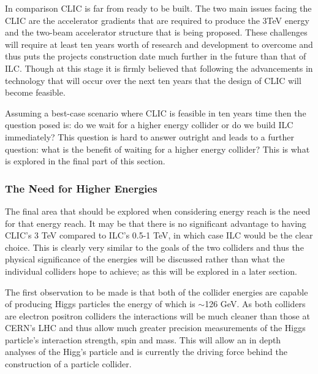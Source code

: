 In comparison CLIC is far from ready to be built. The two main issues facing the CLIC are the accelerator gradients that are required to produce the 3TeV energy and the two-beam accelerator structure that is being proposed. These challenges will require at least ten years worth of research and development to overcome and thus puts the projects construction date much further in the future than that of ILC. Though at this stage it is firmly believed that following the advancements in technology that will occur over the next ten years that the design of CLIC will become feasible.

Assuming a best-case scenario where CLIC is feasible in ten years time then the question posed is: do we wait for a higher energy collider or do we build ILC immediately? This question is hard to answer outright and leads to a further question: what is the benefit of waiting for a higher energy collider? This is what is explored in the final part of this section.

\subsubsection{The Need for Higher Energies}
The final area that should be explored when considering energy reach is the need for that energy reach. It may be that there is no significant advantage to having CLIC's 3 TeV compared to ILC's 0.5-1 TeV, in which case ILC would be the clear choice. This is clearly very similar to the goals of the two colliders and thus the physical significance of the energies will be discussed rather than what the individual colliders hope to achieve; as this will be explored in a later section.

The first observation to be made is that both of the collider energies are capable of producing Higgs particles the energy of which is $\sim$126 GeV\cite{CERN:Higgs}. As both colliders are electron positron colliders the interactions will be much cleaner than those at CERN's LHC and thus allow much greater precision measurements of the Higgs particle's interaction strength, spin and mass. This will allow an in depth analyses of the Higg's particle and is currently the driving force behind the construction of a particle collider.

